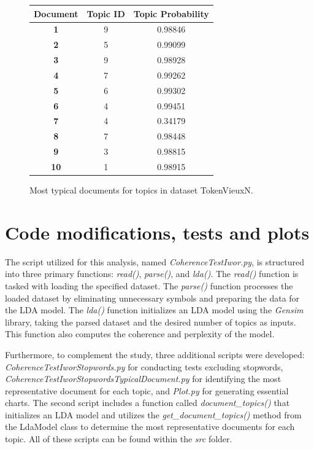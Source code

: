 \documentclass[10pt]{article} %
\begin{document}
\begin{figure}[H]
	\centering
	\begin{tabular}{|c|c|c|}
		\hline \textbf{Document} & \textbf{Topic ID} & \textbf{Topic Probability}  \\  
		\hline \textbf{1} & 9 & 0.98846 \\
		\hline \textbf{2} & 5 & 0.99099\\
		\hline \textbf{3} & 9 & 0.98928 \\
		\hline \textbf{4} & 7 & 0.99262 \\
		\hline \textbf{5} & 6 & 0.99302 \\
		\hline \textbf{6} & 4  & 0.99451 \\
		\hline \textbf{7} & 4 & 0.34179 \\
		\hline \textbf{8} & 7 & 0.98448 \\
		\hline \textbf{9} & 3 & 0.98815 \\
		\hline \textbf{10} & 1 & 0.98915 \\
		\hline
	\end{tabular}
	\caption{Most typical documents for topics in dataset TokenVieuxN.}
\end{figure}

\section{Code modifications, tests and plots}

The script utilized for this analysis, named \textit{CoherenceTestIwor.py}, is structured into three primary functions: \textit{read()}, \textit{parse()}, and \textit{lda()}. The \textit{read()} function is tasked with loading the specified dataset. The \textit{parse()} function processes the loaded dataset by eliminating unnecessary symbols and preparing the data for the LDA model. The \textit{lda()} function initializes an LDA model using the \textit{Gensim} library, taking the parsed dataset and the desired number of topics as inputs. This function also computes the coherence and perplexity of the model.

Furthermore, to complement the study, three additional scripts were developed: \textit{CoherenceTestIworStopwords.py} for conducting tests excluding stopwords, \textit{CoherenceTestIworStopwordsTypicalDocument.py} for identifying the most representative document for each topic, and \textit{Plot.py} for generating essential charts. The second script includes a function called \textit{document\_topics()} that initializes an LDA model and utilizes the \textit{get\_document\_topics()} method from the LdaModel class to determine the most representative documents for each topic. All of these scripts can be found within the \textit{src} folder.
\end{document}
